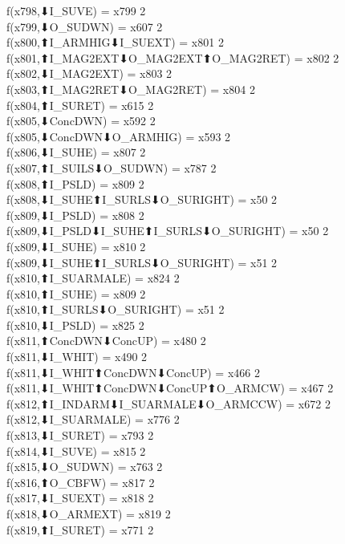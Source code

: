 f(x798,⬇I_SUVE) = x799 {2} \\
f(x799,⬇O_SUDWN) = x607 {2} \\
f(x800,⬆I_ARMHIG⬇I_SUEXT) = x801 {2} \\
f(x801,⬆I_MAG2EXT⬇O_MAG2EXT⬆O_MAG2RET) = x802 {2} \\
f(x802,⬇I_MAG2EXT) = x803 {2} \\
f(x803,⬆I_MAG2RET⬇O_MAG2RET) = x804 {2} \\
f(x804,⬆I_SURET) = x615 {2} \\
f(x805,⬇ConcDWN) = x592 {2} \\
f(x805,⬇ConcDWN⬇O_ARMHIG) = x593 {2} \\
f(x806,⬇I_SUHE) = x807 {2} \\
f(x807,⬆I_SUILS⬇O_SUDWN) = x787 {2} \\
f(x808,⬆I_PSLD) = x809 {2} \\
f(x808,⬇I_SUHE⬆I_SURLS⬇O_SURIGHT) = x50 {2} \\
f(x809,⬇I_PSLD) = x808 {2} \\
f(x809,⬇I_PSLD⬇I_SUHE⬆I_SURLS⬇O_SURIGHT) = x50 {2} \\
f(x809,⬇I_SUHE) = x810 {2} \\
f(x809,⬇I_SUHE⬆I_SURLS⬇O_SURIGHT) = x51 {2} \\
f(x810,⬆I_SUARMALE) = x824 {2} \\
f(x810,⬆I_SUHE) = x809 {2} \\
f(x810,⬆I_SURLS⬇O_SURIGHT) = x51 {2} \\
f(x810,⬇I_PSLD) = x825 {2} \\
f(x811,⬆ConcDWN⬇ConcUP) = x480 {2} \\
f(x811,⬇I_WHIT) = x490 {2} \\
f(x811,⬇I_WHIT⬆ConcDWN⬇ConcUP) = x466 {2} \\
f(x811,⬇I_WHIT⬆ConcDWN⬇ConcUP⬆O_ARMCW) = x467 {2} \\
f(x812,⬆I_INDARM⬇I_SUARMALE⬇O_ARMCCW) = x672 {2} \\
f(x812,⬇I_SUARMALE) = x776 {2} \\
f(x813,⬇I_SURET) = x793 {2} \\
f(x814,⬇I_SUVE) = x815 {2} \\
f(x815,⬇O_SUDWN) = x763 {2} \\
f(x816,⬆O_CBFW) = x817 {2} \\
f(x817,⬇I_SUEXT) = x818 {2} \\
f(x818,⬇O_ARMEXT) = x819 {2} \\
f(x819,⬆I_SURET) = x771 {2} \\
